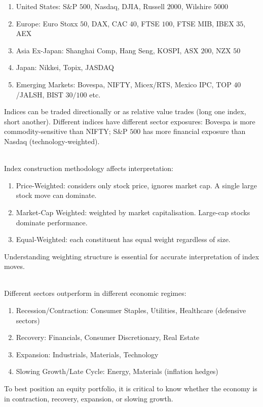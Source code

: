 \begin{remark} 
\begin{enumerate}[label=\roman*.]
\setlength{\itemsep}{0pt}
\item United States: S\&P $500$, Nasdaq, DJIA, Russell $2000$, Wilshire $5000$
\item Europe: Euro Stoxx $50$, DAX, CAC $40$, FTSE $100$, FTSE MIB, IBEX $35$, AEX
\item Asia Ex-Japan: Shanghai Comp, Hang Seng, KOSPI, ASX $200$, NZX $50$
\item Japan: Nikkei, Topix, JASDAQ
\item Emerging Markets: Bovespa, NIFTY, Micex/RTS, Mexico IPC, TOP $40$/JALSH, BIST $30/100$ etc.
\end{enumerate}
Indices can be traded directionally or as relative value trades (long one index, short another). Different indices have different sector exposures: Bovespa is more commodity-sensitive than NIFTY; S\&P $500$ has more financial exposure than Nasdaq (technology-weighted).
\end{remark}

\begin{remark} \\
Index construction methodology affects interpretation:
\begin{enumerate}[label=\roman*.]
\setlength{\itemsep}{0pt}
\item Price-Weighted: considers only stock price, ignores market cap. A single large stock move can dominate.
\item Market-Cap Weighted: weighted by market capitalisation. Large-cap stocks dominate performance.
\item Equal-Weighted: each constituent has equal weight regardless of size.
\end{enumerate}
Understanding weighting structure is essential for accurate interpretation of index moves.
\end{remark}

\begin{remark} \\
Different sectors outperform in different economic regimes:
\begin{enumerate}[label=\roman*.]
\setlength{\itemsep}{0pt}
\item Recession/Contraction: Consumer Staples, Utilities, Healthcare (defensive sectors)
\item Recovery: Financials, Consumer Discretionary, Real Estate
\item Expansion: Industrials, Materials, Technology
\item Slowing Growth/Late Cycle: Energy, Materials (inflation hedges)
\end{enumerate}
To best position an equity portfolio, it is critical to know whether the economy is in contraction, recovery, expansion, or slowing growth.
\end{remark}

